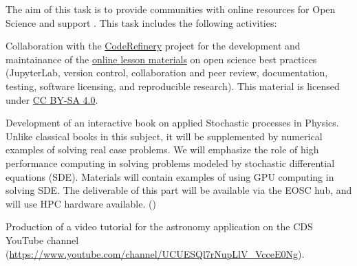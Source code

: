 \begin{task}[
  title=Online resources for open science,
  id=online-resources,
  lead=INSERM,
  PM=14,
  wphases={0-48},
  partners={CDS,EP,QS,SIL,SRL,UPSUD,WTT,XFEL}
]
  The aim of this task is to provide communities with online resources for Open Science and support .
  This task includes the following activities:
  \begin{compactitem}
  \item Collaboration with the \href{https://coderefinery.org}{CodeRefinery} project for the development and maintainance of the \href{https://coderefinery.org/lessons/}{online lesson materials} on open science best practices (JupyterLab, version control, collaboration and peer review, documentation, testing, software licensing, and reproducible research).
  This material is licensed under \href{https://creativecommons.org/licenses/by-sa/4.0/}{CC BY-SA 4.0}.
  \item Development of an interactive book on applied Stochastic processes in Physics. Unlike classical books in this subject, it will be supplemented by numerical examples of solving real case problems. We will emphasize the
role of high performance computing in solving problems modeled by stochastic differential equations (SDE). Materials will contain examples of using GPU computing in solving SDE. The deliverable of this part will be available via the EOSC hub, and will use HPC hardware available. ()
  \item Production of a video tutorial for the astronomy application on the 
      CDS YouTube channel (\url{https://www.youtube.com/channel/UCUESQl7rNupLlV_VcceE0Ng}).
  \end{compactitem}
\end{task}
